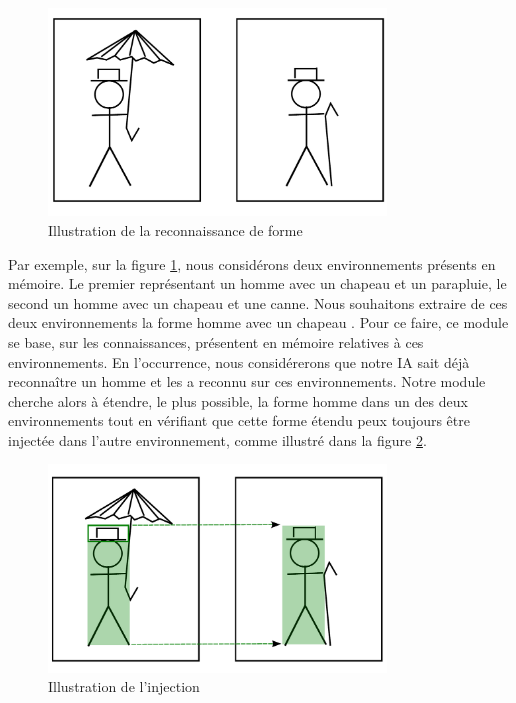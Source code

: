 \begin{figure}[H] 
\begin{center}
\includegraphics[width=0.8\textwidth]{files/raisonneur/reconnaissance_de_formes_0} 
\end{center}
\caption{Illustration de la reconnaissance de forme} 
\label{img_reco_forme_0}
\end{figure}

Par exemple, sur la figure \ref{img_reco_forme_0}, nous considérons deux environnements présents en mémoire. Le premier représentant un homme avec un chapeau et un parapluie, le second un homme avec un chapeau et une canne. Nous souhaitons extraire de ces deux environnements la forme \og homme avec un chapeau \fg{}. Pour ce faire, ce module se base, sur les connaissances, présentent en mémoire relatives à ces environnements. En l'occurrence, nous considérerons que notre IA sait déjà reconnaître un homme et les a reconnu sur ces environnements. Notre module cherche alors à étendre, le plus possible, la forme \og homme \fg dans un des deux environnements tout en vérifiant que cette forme étendu peux toujours être injectée dans l'autre environnement, comme illustré dans la figure \ref{img_reco_forme_injection}.

\begin{figure}[H] 
\begin{center}
\includegraphics[width=0.8\textwidth]{files/raisonneur/reconnaissance_de_formes_injection} 
\end{center}
\caption{Illustration de l'injection} 
\label{img_reco_forme_injection}
\end{figure}

